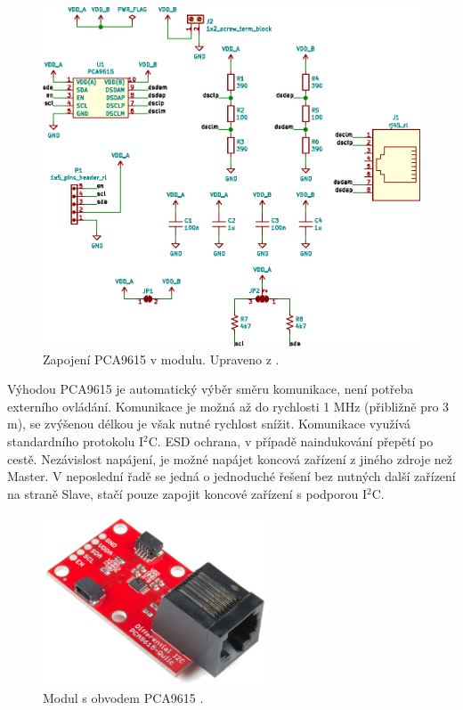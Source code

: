 \begin{figure}[H]
    \centering
    \includegraphics[width=\textwidth]{images/svg/kicad/zapojeni-pca9615-i2c-sbernice.eps}
    \caption{Zapojení PCA9615 v modulu. Upraveno z \cite{pca9615-schema-zapojeni}.}
    \label{fig:zapojeni-pca9615-i2c-sbernice}
\end{figure}

Výhodou PCA9615 je automatický výběr směru komunikace, není potřeba externího ovládání. Komunikace je možná až do rychlosti 1 MHz (přibližně pro 3 m), se zvýšenou délkou je však nutné rychlost snížit. Komunikace využívá standardního protokolu I$^2$C. ESD ochrana, v případě naindukování přepětí po cestě. Nezávislost napájení, je možné napájet koncová zařízení z jiného zdroje než Master. V neposlední řadě se jedná o jednoduché řešení bez nutných další zařízení na straně Slave, stačí pouze zapojit koncové zařízení s podporou I$^2$C.

\begin{figure}[H]
    \centering
    \includegraphics[width=0.6\textwidth]{images/modul-pca9615-i2c-sbernice.png}
    \caption[Modul s obvodem PCA9615.]{Modul s obvodem PCA9615 \cite{pca9615-i2c-modul}.}
    \label{fig:modul-pca9615-i2c-sbernice}
\end{figure}

